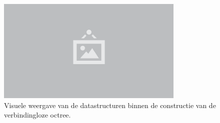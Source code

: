 \begin{figure}
  \centering
  \includegraphics[width=0.8\textwidth]{./img/raw/placeholder.png}
  \caption{Visuele weergave van de datastructuren binnen de constructie van de verbindingloze octree.}
  \label{fig:hs-verbindingloze-octree-algoritme}
\end{figure}
